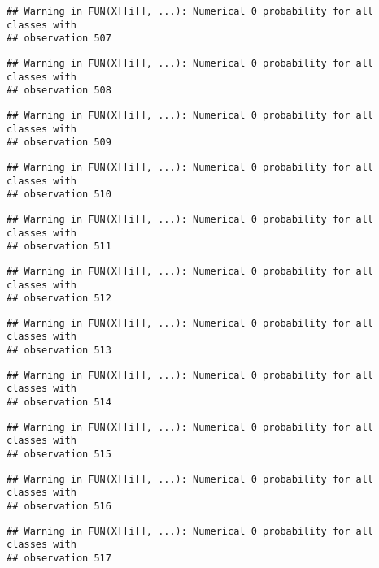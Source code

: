\documentclass[
]{article}
\begin{document}
\begin{verbatim}
## Warning in FUN(X[[i]], ...): Numerical 0 probability for all classes with
## observation 507
\end{verbatim}

\begin{verbatim}
## Warning in FUN(X[[i]], ...): Numerical 0 probability for all classes with
## observation 508
\end{verbatim}

\begin{verbatim}
## Warning in FUN(X[[i]], ...): Numerical 0 probability for all classes with
## observation 509
\end{verbatim}

\begin{verbatim}
## Warning in FUN(X[[i]], ...): Numerical 0 probability for all classes with
## observation 510
\end{verbatim}

\begin{verbatim}
## Warning in FUN(X[[i]], ...): Numerical 0 probability for all classes with
## observation 511
\end{verbatim}

\begin{verbatim}
## Warning in FUN(X[[i]], ...): Numerical 0 probability for all classes with
## observation 512
\end{verbatim}

\begin{verbatim}
## Warning in FUN(X[[i]], ...): Numerical 0 probability for all classes with
## observation 513
\end{verbatim}

\begin{verbatim}
## Warning in FUN(X[[i]], ...): Numerical 0 probability for all classes with
## observation 514
\end{verbatim}

\begin{verbatim}
## Warning in FUN(X[[i]], ...): Numerical 0 probability for all classes with
## observation 515
\end{verbatim}

\begin{verbatim}
## Warning in FUN(X[[i]], ...): Numerical 0 probability for all classes with
## observation 516
\end{verbatim}

\begin{verbatim}
## Warning in FUN(X[[i]], ...): Numerical 0 probability for all classes with
## observation 517
\end{verbatim}
\end{document}
